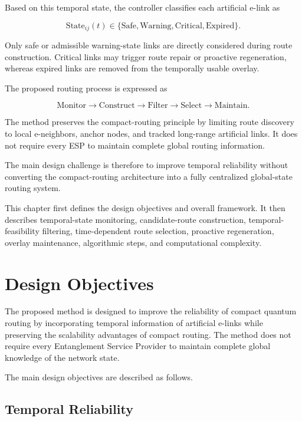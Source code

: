Based on this temporal state, the controller classifies each artificial e-link as

\begin{equation}
    \mathrm{State}_{ij}(t)
    \in
    \{
    \mathrm{Safe},
    \mathrm{Warning},
    \mathrm{Critical},
    \mathrm{Expired}
    \}.
\end{equation}

Only safe or admissible warning-state links are directly considered during route construction. Critical links may trigger route repair or proactive regeneration, whereas expired links are removed from the temporally usable overlay.

The proposed routing process is expressed as

\begin{equation}
    \mathrm{Monitor}
    \rightarrow
    \mathrm{Construct}
    \rightarrow
    \mathrm{Filter}
    \rightarrow
    \mathrm{Select}
    \rightarrow
    \mathrm{Maintain}.
\end{equation}

The method preserves the compact-routing principle by limiting route discovery to local e-neighbors, anchor nodes, and tracked long-range artificial links. It does not require every ESP to maintain complete global routing information.

The main design challenge is therefore to improve temporal reliability without converting the compact-routing architecture into a fully centralized global-state routing system.

This chapter first defines the design objectives and overall framework. It then describes temporal-state monitoring, candidate-route construction, temporal-feasibility filtering, time-dependent route selection, proactive regeneration, overlay maintenance, algorithmic steps, and computational complexity.
\section{Design Objectives}

The proposed method is designed to improve the reliability of compact quantum routing by incorporating temporal information of artificial e-links while preserving the scalability advantages of compact routing. The method does not require every Entanglement Service Provider to maintain complete global knowledge of the network state.

The main design objectives are described as follows.

\subsection{Temporal Reliability}

